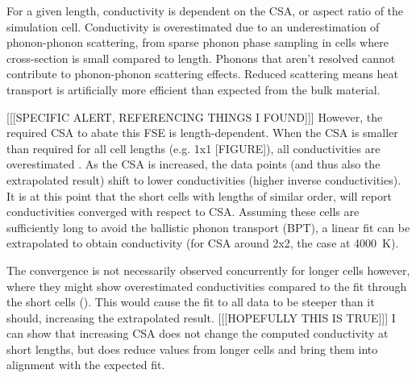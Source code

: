 For a given length, conductivity is dependent on the CSA, or aspect ratio of the simulation cell. Conductivity is overestimated due to an underestimation of phonon-phonon scattering, from sparse phonon phase sampling in cells where cross-section is small compared to length. Phonons that aren't resolved cannot contribute to phonon-phonon scattering effects. Reduced scattering means heat transport is artificially more efficient than expected from the bulk material. 

[[[SPECIFIC ALERT, REFERENCING THINGS I FOUND]]] However, the required CSA to abate this FSE is length-dependent. When the CSA is smaller than required for all cell lengths (e.g. 1x1 [FIGURE]), all conductivities are overestimated \citep[][albeit for nanotube diameter?]{Thomas2010}. As the CSA is increased, the data points (and thus also the extrapolated result) shift to lower conductivities (higher inverse conductivities). It is at this point that the short cells with lengths of similar order, will report conductivities converged with respect to CSA. Assuming these cells are sufficiently long to avoid the ballistic phonon transport (BPT), a linear fit can be extrapolated to obtain conductivity (for CSA around 2x2, the case at 4000~K). 

The convergence is not necessarily observed concurrently for longer cells however, where they might show overestimated conductivities compared to the fit through the short cells (\cite{Hu2011}). This would cause the fit to all data to be steeper than it should, increasing the extrapolated result.  [[[HOPEFULLY THIS IS TRUE]]] I can show that increasing CSA does not change the computed conductivity at short lengths, but does reduce values from longer cells and bring them into alignment with the expected fit.



